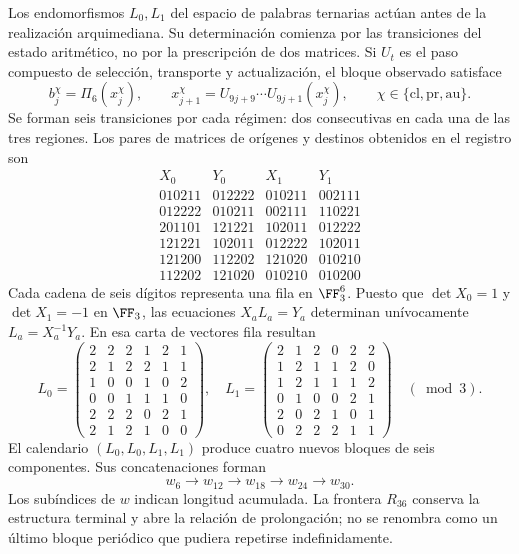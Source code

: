 Los endomorfismos \(L_0,L_1\) del espacio de palabras ternarias actúan antes de la realización arquimediana. Su determinación comienza por las transiciones del estado aritmético, no por la prescripción de dos matrices. Si \(U_t\) es el paso compuesto de selección, transporte y actualización, el bloque observado satisface
\[
 b_j^\chi=\Pi_6(x_j^\chi),\qquad
 x_{j+1}^\chi=U_{9j+9}\cdots U_{9j+1}(x_j^\chi),
 \qquad \chi\in\{\mathrm{cl},\mathrm{pr},\mathrm{au}\}.
\]
Se forman seis transiciones por cada régimen: dos consecutivas en cada una de las tres regiones. Los pares de matrices de orígenes y destinos obtenidos en el registro son
\[
\begin{array}{c|c|c|c}
X_0&Y_0&X_1&Y_1\\\hline
010211&012222&010211&002111\\
012222&010211&002111&110221\\
201101&121221&102011&012222\\
121221&102011&012222&102011\\
121200&112202&121020&010210\\
112202&121020&010210&010200
\end{array}
\]
Cada cadena de seis dígitos representa una fila en \(\FF_3^6\). Puesto que \(\det X_0=1\) y \(\det X_1=-1\) en \(\FF_3\), las ecuaciones \(X_aL_a=Y_a\) determinan unívocamente \(L_a=X_a^{-1}Y_a\). En esa carta de vectores fila resultan
\[
 L_0=\begin{pmatrix}
 2&2&2&1&2&1\\2&1&2&2&1&1\\1&0&0&1&0&2\\
 0&0&1&1&1&0\\2&2&2&0&2&1\\2&1&2&1&0&0
 \end{pmatrix},\quad
 L_1=\begin{pmatrix}
 2&1&2&0&2&2\\1&2&1&1&2&0\\1&2&1&1&1&2\\
 0&1&0&0&2&1\\2&0&2&1&0&1\\0&2&2&2&1&1
 \end{pmatrix}\quad(\bmod3).
\]
El calendario \((L_0,L_0,L_1,L_1)\) produce cuatro nuevos bloques de seis componentes. Sus concatenaciones forman
\[
 w_6\longrightarrow w_{12}\longrightarrow w_{18}
 \longrightarrow w_{24}\longrightarrow w_{30}.
\]
Los subíndices de \(w\) indican longitud acumulada. La frontera \(R_{36}\) conserva la estructura terminal y abre la relación de prolongación; no se renombra como un último bloque periódico que pudiera repetirse indefinidamente.

